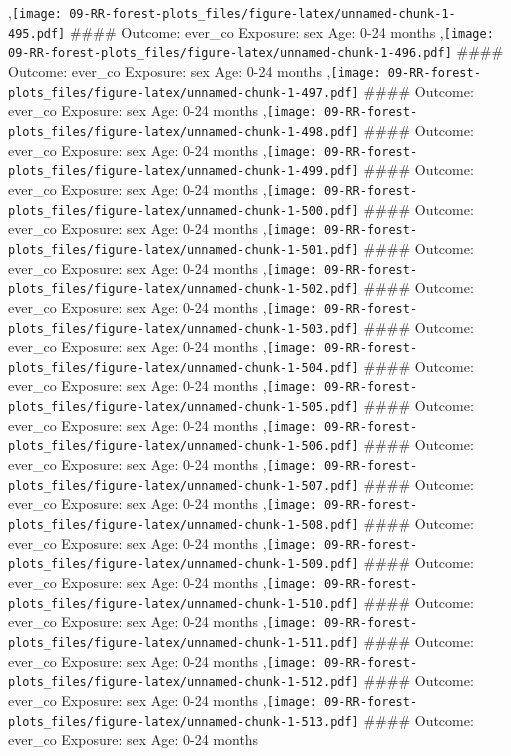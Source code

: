 \documentclass[
  9pt,
]{book}
\begin{document}
,\texttt{[image: 09-RR-forest-plots\_files/figure-latex/unnamed-chunk-1-495.pdf]}
\#\#\#\# Outcome: ever\_co Exposure: sex Age: 0-24 months
,\texttt{[image: 09-RR-forest-plots\_files/figure-latex/unnamed-chunk-1-496.pdf]}
\#\#\#\# Outcome: ever\_co Exposure: sex Age: 0-24 months
,\texttt{[image: 09-RR-forest-plots\_files/figure-latex/unnamed-chunk-1-497.pdf]}
\#\#\#\# Outcome: ever\_co Exposure: sex Age: 0-24 months
,\texttt{[image: 09-RR-forest-plots\_files/figure-latex/unnamed-chunk-1-498.pdf]}
\#\#\#\# Outcome: ever\_co Exposure: sex Age: 0-24 months
,\texttt{[image: 09-RR-forest-plots\_files/figure-latex/unnamed-chunk-1-499.pdf]}
\#\#\#\# Outcome: ever\_co Exposure: sex Age: 0-24 months
,\texttt{[image: 09-RR-forest-plots\_files/figure-latex/unnamed-chunk-1-500.pdf]}
\#\#\#\# Outcome: ever\_co Exposure: sex Age: 0-24 months
,\texttt{[image: 09-RR-forest-plots\_files/figure-latex/unnamed-chunk-1-501.pdf]}
\#\#\#\# Outcome: ever\_co Exposure: sex Age: 0-24 months
,\texttt{[image: 09-RR-forest-plots\_files/figure-latex/unnamed-chunk-1-502.pdf]}
\#\#\#\# Outcome: ever\_co Exposure: sex Age: 0-24 months
,\texttt{[image: 09-RR-forest-plots\_files/figure-latex/unnamed-chunk-1-503.pdf]}
\#\#\#\# Outcome: ever\_co Exposure: sex Age: 0-24 months
,\texttt{[image: 09-RR-forest-plots\_files/figure-latex/unnamed-chunk-1-504.pdf]}
\#\#\#\# Outcome: ever\_co Exposure: sex Age: 0-24 months
,\texttt{[image: 09-RR-forest-plots\_files/figure-latex/unnamed-chunk-1-505.pdf]}
\#\#\#\# Outcome: ever\_co Exposure: sex Age: 0-24 months
,\texttt{[image: 09-RR-forest-plots\_files/figure-latex/unnamed-chunk-1-506.pdf]}
\#\#\#\# Outcome: ever\_co Exposure: sex Age: 0-24 months
,\texttt{[image: 09-RR-forest-plots\_files/figure-latex/unnamed-chunk-1-507.pdf]}
\#\#\#\# Outcome: ever\_co Exposure: sex Age: 0-24 months
,\texttt{[image: 09-RR-forest-plots\_files/figure-latex/unnamed-chunk-1-508.pdf]}
\#\#\#\# Outcome: ever\_co Exposure: sex Age: 0-24 months
,\texttt{[image: 09-RR-forest-plots\_files/figure-latex/unnamed-chunk-1-509.pdf]}
\#\#\#\# Outcome: ever\_co Exposure: sex Age: 0-24 months
,\texttt{[image: 09-RR-forest-plots\_files/figure-latex/unnamed-chunk-1-510.pdf]}
\#\#\#\# Outcome: ever\_co Exposure: sex Age: 0-24 months
,\texttt{[image: 09-RR-forest-plots\_files/figure-latex/unnamed-chunk-1-511.pdf]}
\#\#\#\# Outcome: ever\_co Exposure: sex Age: 0-24 months
,\texttt{[image: 09-RR-forest-plots\_files/figure-latex/unnamed-chunk-1-512.pdf]}
\#\#\#\# Outcome: ever\_co Exposure: sex Age: 0-24 months
,\texttt{[image: 09-RR-forest-plots\_files/figure-latex/unnamed-chunk-1-513.pdf]}
\#\#\#\# Outcome: ever\_co Exposure: sex Age: 0-24 months
\end{document}
